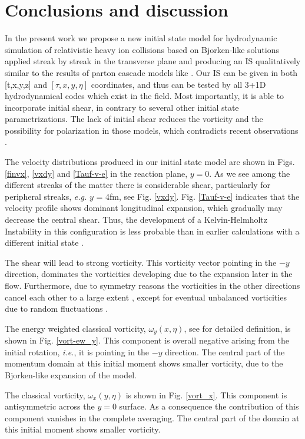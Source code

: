 \documentclass[aps,prc,twocolumn,floatfix,showpacs,a4paper,
nofootinbib,amsmath,amssymb]{revtex4-1}
\begin{document}
\section{Conclusions and discussion}
In the present work we propose a new initial state model for hydrodynamic simulation of relativistic heavy ion collisions based on Bjorken-like solutions applied streak by streak in the transverse plane and producing an IS qualitatively similar to the results of parton cascade models like \cite{Fig.1}. Our IS can be given in both [t,x,y,z] and $[\tau, x, y, \eta]$ coordinates, and thus can be tested by all 3+1D hydrodynamical codes which exist in the field. Most importantly, it is able to incorporate
initial shear, in contrary to several other initial state 
parametrizations. The lack of initial shear reduces 
the vorticity and the possibility for polarization in those
models, which contradicts recent observations \cite{Lisa,Nature}.


The  velocity  distributions produced in our initial state model are shown in Figs. \ref{finvx}, \ref{vxdy} and \ref{Tauf-v-e} in the reaction plane, $y=0$.  As we see among the different streaks of the matter there is considerable shear, particularly for peripheral
streaks, {\it e.g.} $y$ = 4fm, see Fig. \ref{vxdy}. Fig. \ref{Tauf-v-e}
indicates that the velocity profile shows dominant longitudinal
expansion, which gradually may decrease the central shear. Thus, the 
development of a Kelvin-Helmholtz Instability   in this configuration is less probable than  in earlier calculations with a different initial state \cite{hydro2}.

The shear will lead to strong vorticity. This vorticity vector pointing in the $-y$ direction, dominates the vorticities developing due to
the expansion later in the flow. Furthermore, due to symmetry
reasons the vorticities in the other directions cancel each other
to a large extent \cite{Xie2016,Xie2017}, except for eventual unbalanced
vorticities due to random fluctuations
\cite{Floe2013,Stefan}.


The energy weighted classical vorticity, $\omega_y(x,\eta)$, see \cite{CMW13} for detailed definition, is
shown in Fig. \ref{vort-ew_y}. This component is overall negative
arising from the initial rotation,
{\it i.e.}, it is pointing in the $-y$ direction. 
The central part of the momentum domain
at this initial moment shows smaller vorticity, due to the
Bjorken-like expansion of the model.

The classical vorticity, $\omega_x(y,\eta)$ is
shown in Fig. \ref{vort_x}. This component is antisymmetric 
across the $y=0$ surface.
As a consequence the contribution of this component 
vanishes in the complete averaging.
The central part of the domain
at this initial moment shows smaller vorticity.
\end{document}
